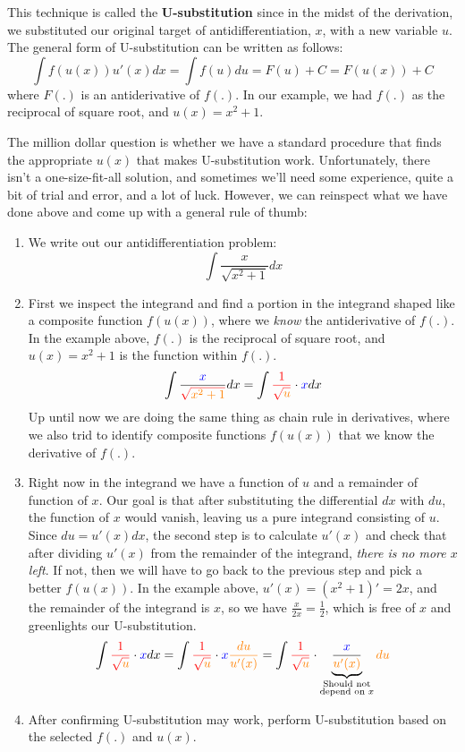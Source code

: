 This technique is called the \textbf{U-substitution} since in the midst of the derivation, we 
 substituted our original target of antidifferentiation, $x$, with a new variable $u$.  The general form of U-substitution can be written as follows:
\[\int f(u(x)) u'(x) dx = \int f(u) du = F(u) + C = F(u(x)) + C\]
where $F(.)$ is an antiderivative of $f(.)$.  In our example, we had $f(.)$ as the reciprocal of square root, and $u(x) = x^2 + 1$.

The million dollar question is whether we have a standard procedure that finds the appropriate $u(x)$ that makes U-substitution work.  Unfortunately, there isn't a one-size-fit-all solution, and sometimes we'll need some experience, quite a bit of trial and error, and a lot of luck.  However, we can reinspect what we have done above and come up with a general rule of thumb:
\begin{enumerate}
    \item We write out our antidifferentiation problem:
    \[\int \frac{x}{\sqrt{x^2+1}} dx\]
    \item First we inspect the integrand and find a portion in the integrand shaped like a composite function $f(u(x))$, where we \textit{know} the antiderivative of $f(.)$.  In the example above, $f(.)$ is the reciprocal of square root, and $u(x) = x^2 + 1$ is the function within $f(.)$.  
    \[\int \frac{\textcolor{blue}{x}}{\textcolor{red}{\sqrt{\textcolor{orange}{x^2+1}}}} dx = \int \textcolor{red}{\frac{1}{\sqrt{\textcolor{orange}{u}}}} \cdot \textcolor{blue}{x}dx\]
    Up until now we are doing the same thing as chain rule in derivatives, where we also trid to identify composite functions $f(u(x))$ that we know the derivative of $f(.)$.
    \item Right now in the integrand we have a function of $u$ and a remainder of function of $x$. Our goal is that after substituting the differential $dx$ with $du$, the function of $x$ would vanish, leaving us a pure integrand consisting of $u$.  Since $du = u'(x)dx$, the second step is to calculate $u'(x)$ and check that after dividing $u'(x)$ from the remainder of the integrand, \textit{there is no more $x$ left}.  If not, then we will have to go back to the previous step and pick a better $f(u(x))$. In the example above, $u'(x) = (x^2 + 1)' = 2x$, and the remainder of the integrand is $x$, so we have $\frac{x}{2x} = \frac{1}{2}$, which is free of $x$ and greenlights our U-substitution.
    \[\int \textcolor{red}{\frac{1}{\sqrt{\textcolor{orange}{u}}}} \cdot \textcolor{blue}{x} dx = \int \textcolor{red}{\frac{1}{\sqrt{\textcolor{orange}{u}}}} \cdot \textcolor{blue}{x} \textcolor{orange}{\frac{du}{u'(x)}} =\int \textcolor{red}{\frac{1}{\sqrt{\textcolor{orange}{u}}}} \cdot \underbrace{\frac{\textcolor{blue}{x}}{\textcolor{orange}{u'(x)}}}_{\substack{\text{Should not} \\ \text{depend on }x}} \textcolor{orange}{du}\]
    \item After confirming U-substitution may work, perform U-substitution based on the selected $f(.)$ and $u(x)$.
\end{enumerate}

